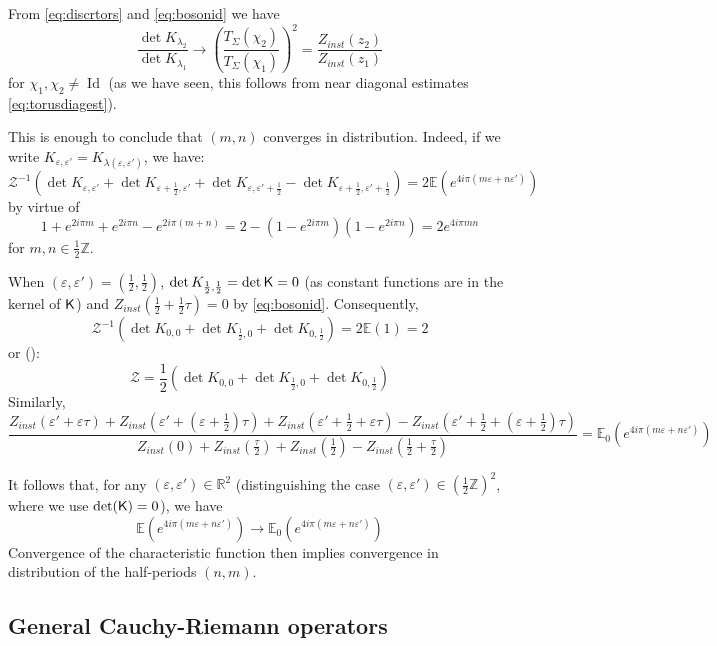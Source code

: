 \documentclass[10pt]{article}
\newcommand{\Z}{\mathbb{Z}}
\newcommand{\R}{\mathbb{R}}
\newcommand{\E}{\mathbb{E}}
\newcommand{\mc}{\mathcal}
\newcommand{\eps}{\varepsilon}
\newcommand{\rK}{{\sf K}}
\DeclareMathOperator{\Id}{Id}
\begin{document}
From \eqref{eq:discrtors} and \eqref{eq:bosonid} we have
$$\frac{\det{K_{\lambda_2}}}{\det{K_{\lambda_1}}}\longrightarrow\left(\frac{T_\Sigma(\chi_2)}{T_\Sigma(\chi_1)}\right)^2=\frac{Z_{inst}(z_2)}{Z_{inst}(z_1)}$$
for $\chi_1,\chi_2\neq\Id$ (as we have seen, this follows from near diagonal estimates \eqref{eq:torusdiagest}).
%
%
%

This is enough to conclude that $(m,n)$ converges in distribution. Indeed, if we write $K_{\eps,\eps'}=K_{\lambda(\eps,\eps')}$, we have:
$${\mc Z}^{-1}\left(\det K_{\eps,\eps'}+\det K_{\eps+\frac 12,\eps'}+\det K_{\eps,\eps'+\frac 12}-\det K_{\eps+\frac 12,\eps'+\frac 12}\right)=2\E\left(e^{4i\pi(m\eps+n\eps')}\right)$$
by virtue of 
$$1+e^{2i\pi m}+e^{2i\pi n}-e^{2i\pi(m+n)}=2-(1-e^{2i\pi m})(1-e^{2i\pi n})=2e^{4i\pi mn}$$
for $m,n\in \frac 12\Z$. 

When $(\eps,\eps')=(\frac 12,\frac 12)$, $\det K_{\frac12,\frac 12}=\det\rK=0$ (as constant functions are in the kernel of $\rK$) and $Z_{inst}(\frac 12+\frac 12\tau)=0$ by \eqref{eq:bosonid}. Consequently,
$${\mc Z}^{-1}(\det K_{0,0}+\det K_{\frac 12,0}+\det K_{0,\frac 12})=2\E(1)=2$$
or (\cite{Kas_square}):
\begin{equation}\label{eq:toruspartfun}
{\mc Z}=\frac 12(\det K_{0,0}+\det K_{\frac 12,0}+\det K_{0,\frac 12})
\end{equation}
Similarly,
$$\frac{Z_{inst}(\eps'+\eps\tau)+Z_{inst}(\eps'+(\eps+\frac 12)\tau)+Z_{inst}(\eps'+\frac 12+\eps\tau)-Z_{inst}(\eps'+\frac 12+(\eps+\frac 12)\tau)}
{Z_{inst}(0)+Z_{inst}(\frac\tau 2)+Z_{inst}(\frac 12)-Z_{inst}(\frac 12+\frac\tau 2)}
=\E_0\left(e^{4i\pi(m\eps+n\eps')}\right)$$




It follows that, for any $(\eps,\eps')\in\R^2$ (distinguishing the case $(\eps,\eps')\in (\frac 12\Z)^2$, where we use $\det(\rK)=0$), we have
\begin{equation}\label{eq:periodconv}
\E\left(e^{4i\pi(m\eps+n\eps')}\right)\longrightarrow\E_0\left(e^{4i\pi(m\eps+n\eps')}\right)
\end{equation}
Convergence of the characteristic function then implies convergence in distribution of the half-periods $(n,m)$.




\subsection{General Cauchy-Riemann operators}\label{ssec:torusgeneral}
\end{document}
